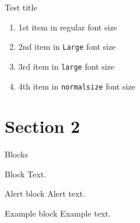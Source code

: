 \documentclass{beamer}
\begin{document}
    \begin{frame}[t]{Test title}
        \begin{enumerate}
            \item<1-> 1st item in regular font size
            \item<2->  \Large 2nd item in \texttt{Large} font size
            \item<2->  \large 3rd item in \texttt{large} font size
            \item<2->   \normalsize 4th item in \texttt{normalsize} font size
        \end{enumerate}
    \end{frame}

    \section{Section 2}
    \begin{frame}{Blocks}
        \begin{block}{Block}
            Text.
        \end{block}
        \pause
        \begin{alertblock}{Alert block}
            Alert \alert{text}.
        \end{alertblock}
        \pause
        \begin{exampleblock}{Example block}
            Example \textcolor{example}{text}.
        \end{exampleblock}
    \end{frame}
    
\end{document}
